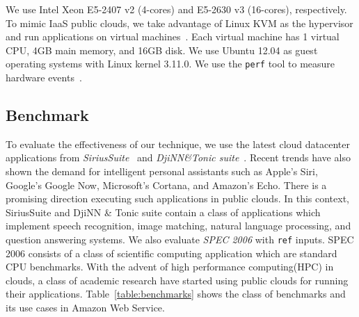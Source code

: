 \documentclass{sig-alternate}
\begin{document}
We use Intel Xeon E5-2407 v2 (4-cores) and E5-2630 v3 (16-cores), respectively. To mimic IaaS public clouds, we take advantage of Linux KVM as the hypervisor and run applications on virtual machines~\cite{Kivity2007}. Each virtual machine has 1 virtual CPU, 4GB main memory, and 16GB disk. We use Ubuntu 12.04 as guest operating systems with Linux kernel 3.11.0. We use the \texttt{perf} tool to measure hardware events~\cite{denew}.
\subsection{Benchmark}
\label{subsec:Benchmark}

To evaluate the effectiveness of our technique, we use the latest cloud datacenter applications from \textit{SiriusSuite}~\cite{sirius} and \textit{DjiNN\&Tonic suite}~\cite{djinn}. Recent trends have also shown the demand for intelligent personal assistants such as Apple's Siri, Google's Google Now, Microsoft's Cortana, and Amazon's Echo. There is a promising direction executing such applications in public clouds. In this context, SiriusSuite and DjiNN \& Tonic suite contain a class of applications which implement speech recognition, image matching, natural language processing, and question answering systems. We also evaluate \textit{SPEC 2006} with \texttt{ref} inputs.  SPEC 2006 consists of a class of scientific computing application which are standard CPU benchmarks. With the advent of high performance computing(HPC) in clouds, a class of academic research have started using public clouds for running their applications. Table~\ref{table:benchmarks} shows the class of benchmarks and its use cases in Amazon Web Service.
\end{document}
